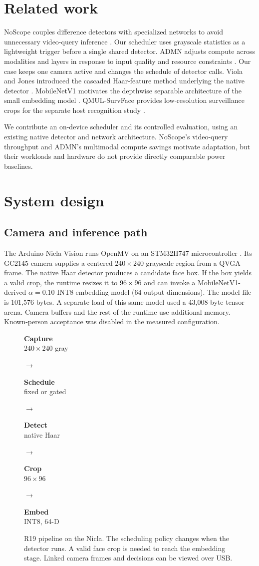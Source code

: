\documentclass[10pt,letterpaper,twocolumn]{article}
\newcommand{\stage}[2]{\colorbox{softblue}{\parbox[c][2.35em][c]{0.15\linewidth}{\centering\small\textbf{#1}\\[-1pt]\footnotesize #2}}}
\newcommand{\nextstage}{\hspace{0.55em}\textcolor{rust}{$\rightarrow$}\hspace{0.55em}}
\begin{document}
\section{Related work}
NoScope couples difference detectors with specialized networks to avoid unnecessary video-query inference \cite{noscope}. Our scheduler uses grayscale statistics as a lightweight trigger before a single shared detector. ADMN adjusts compute across modalities and layers in response to input quality and resource constraints \cite{admn}. Our case keeps one camera active and changes the schedule of detector calls. Viola and Jones introduced the cascaded Haar-feature method underlying the native detector \cite{viola}. MobileNetV1 motivates the depthwise separable architecture of the small embedding model \cite{mobilenet}. QMUL-SurvFace provides low-resolution surveillance crops for the separate host recognition study \cite{survface}.

We contribute an on-device scheduler and its controlled evaluation, using an existing native detector and network architecture. NoScope's video-query throughput and ADMN's multimodal compute savings motivate adaptation, but their workloads and hardware do not provide directly comparable power baselines.

\section{System design}
\subsection{Camera and inference path}
The Arduino Nicla Vision runs OpenMV on an STM32H747 microcontroller \cite{nicla,openmv}. Its GC2145 camera supplies a centered \(240\times240\) grayscale region from a QVGA frame. The native Haar detector produces a candidate face box. If the box yields a valid crop, the runtime resizes it to \(96\times96\) and can invoke a MobileNetV1-derived \(\alpha=0.10\) INT8 embedding model (64 output dimensions). The model file is 101{,}576 bytes. A separate load of this same model used a 43{,}008-byte tensor arena. Camera buffers and the rest of the runtime use additional memory. Known-person acceptance was disabled in the measured configuration.

\begin{figure}[t]
\centering
\stage{Capture}{\(240\times240\) gray}\nextstage
\stage{Schedule}{fixed or gated}\nextstage
\stage{Detect}{native Haar}\nextstage
\stage{Crop}{\(96\times96\)}\nextstage
\stage{Embed}{INT8, 64-D}
\caption{R19 pipeline on the Nicla. The scheduling policy changes when the detector runs. A valid face crop is needed to reach the embedding stage. Linked camera frames and decisions can be viewed over USB.}
\label{fig:pipeline}
\end{figure}
\end{document}

